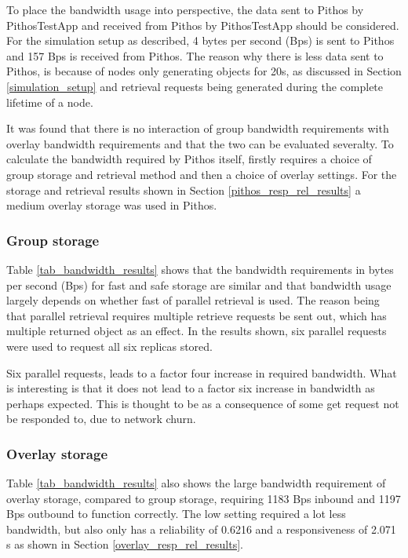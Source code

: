 To place the bandwidth usage into perspective, the data sent to Pithos by PithosTestApp and received from Pithos by PithosTestApp should be considered. For the simulation setup as described, 4 bytes per second (Bps) is sent to Pithos and 157 Bps is received from Pithos. The reason why there is less data sent to Pithos, is because of nodes only generating objects for 20s, as discussed in Section \ref{simulation_setup} and retrieval requests being generated during the complete lifetime of a node.

It was found that there is no interaction of group bandwidth requirements with overlay bandwidth requirements and that the two can be evaluated severalty. To calculate the bandwidth required by Pithos itself, firstly requires a choice of group storage and retrieval method and then a choice of overlay settings. For the storage and retrieval results shown in Section \ref{pithos_resp_rel_results} a medium overlay storage was used in Pithos.

\subsubsection{Group storage}
Table \ref{tab_bandwidth_results} shows that the bandwidth requirements in bytes per second (Bps) for fast and safe storage are similar and that bandwidth usage largely depends on whether fast of parallel retrieval is used. The reason being that parallel retrieval requires multiple retrieve requests be sent out, which has multiple returned object as an effect. In the results shown, six parallel requests were used to request all six replicas stored.

Six parallel requests, leads to a factor four increase in required bandwidth. What is interesting is that it does not lead to a factor six increase in bandwidth as perhaps expected. This is thought to be as a consequence of some get request not be responded to, due to network churn.

\subsubsection{Overlay storage}
Table \ref{tab_bandwidth_results} also shows the large bandwidth requirement of overlay storage, compared to group storage, requiring 1183 Bps inbound and 1197 Bps outbound to function correctly. The low setting required a lot less bandwidth, but also only has a reliability of 0.6216 and a responsiveness of 2.071 s as shown in Section \ref{overlay_resp_rel_results}.

